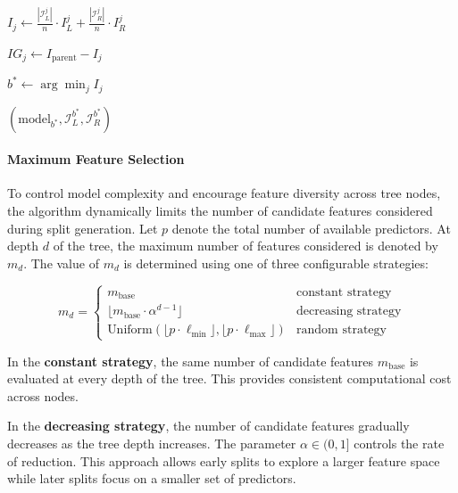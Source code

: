 \begin{algorithm}[H]
{{        $I_j \gets \frac{|\mathcal{I}_L^j|}{n} \cdot I_L^j + \frac{|\mathcal{I}_R^j|}{n} \cdot I_R^j$
        
        $IG_j \gets I_{\text{parent}} - I_j$
        
    }
    
    $b^* \gets \arg\min_{j} I_j$\hfill {}
    
    
    \Return $(\text{model}_{b^*}, \mathcal{I}_L^{b^*}, \mathcal{I}_R^{b^*})$
}
\end{algorithm}

\paragraph{Maximum Feature Selection}\label{maximum-feature-selection}

To control model complexity and encourage feature diversity across tree nodes, the algorithm dynamically limits the number of candidate features considered during split generation. Let \(p\) denote the total number of available predictors. At depth \(d\) of the tree, the maximum number of features considered is denoted by \(m_d\). The value of \(m_d\) is determined using one of three configurable strategies:

\[
m_d =
\begin{cases}
m_{\text{base}} & \text{constant strategy} \\
\lfloor m_{\text{base}} \cdot \alpha^{d-1} \rfloor & \text{decreasing strategy} \\
\text{Uniform}(\lfloor p \cdot \ell_{\min} \rfloor, \lfloor p \cdot \ell_{\max} \rfloor) & \text{random strategy}
\end{cases}
\]

In the \textbf{constant strategy}, the same number of candidate features \(m_{\text{base}}\) is evaluated at every depth of the tree. This provides consistent computational cost across nodes.

In the \textbf{decreasing strategy}, the number of candidate features gradually decreases as the tree depth increases. The parameter \(\alpha \in (0,1]\) controls the rate of reduction. This approach allows early splits to explore a larger feature space while later splits focus on a smaller set of predictors.

